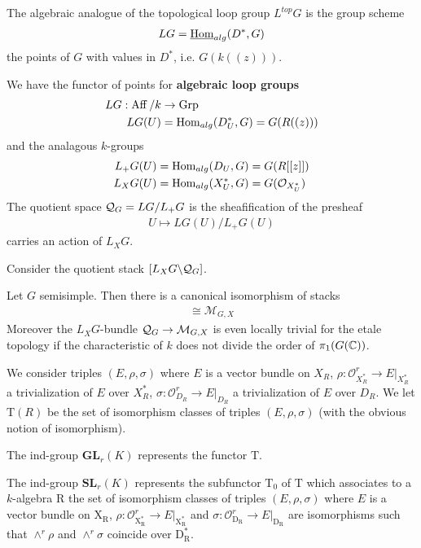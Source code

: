 \documentclass[12pt]{article}
\begin{document}
The algebraic analogue of the topological loop group $L^{top}G$ is the group scheme \begin{align*}
    LG = \underline{\operatorname{Hom}}_{alg}(D^*, G)
\end{align*} the points of $G$ with values in $D^*$, i.e. $G(k((z)))$.
\begin{definition}
    We have the functor of points for \textbf{algebraic loop groups} \begin{align*}
        LG: \operatorname{Aff}/k & \to \operatorname{Grp}                           \\
        LG(U)      & = \operatorname{Hom}_{alg}(D_U^*, G) = G(R((z)))
    \end{align*} and the analagous $k$-groups \begin{align*}
        L_+G(U) & = \operatorname{Hom}_{alg}(D_U, G) = G(R[[z]])        \\
        L_XG(U) & = \operatorname{Hom}_{alg}(X^*_U, G) = G({\mathcal{O}}_{X^*_U})
    \end{align*} The quotient space ${\mathcal{Q}}_G = LG/L_+G$ is the sheafification of the presheaf \begin{align*}
        U \mapsto LG(U)/L_+G(U)
    \end{align*} carries an action of $L_XG$.
\end{definition}
Consider the quotient stack $[L_XG\backslash {\mathcal{Q}}_G]$.
\begin{theorem}[Uniformization]
    Let $G$ semisimple. Then there is a canonical isomorphism of stacks \begin{align*}
        [L_XG\backslash \cQ_G] \cong \mathcal{M}_{G,X}
    \end{align*} Moreover the $L_XG$-bundle ${\mathcal{Q}}_G \to {\mathcal{M}}_{G,X}$ is even locally trivial for the etale topology if the characteristic of $k$ does not divide the order of $\pi_1(G(\mathbb{C}))$.
\end{theorem}
We consider triples $(E, \rho, \sigma)$ where $E$ is a vector bundle on $X_R$, $\rho : \mathcal{O}^r_{X^*_R} \longrightarrow E|_{X^*_R}$ a trivialization of $E$ over $X^*_R$, $\sigma : \mathcal{O}^r_{D_R} \longrightarrow E|_{D_R}$ a trivialization of $E$ over $D_R$. We let $\textrm{T}(R)$ be the set of isomorphism classes of triples $(E, \rho, \sigma)$ (with the obvious notion of isomorphism).
\begin{proposition}
    The ind-group $\mathbf{GL}_r(K)$ represents the functor $\textrm{T}$.
\end{proposition}
\begin{proposition}
    The ind-group $\mathbf{SL}_r(K)$ represents the subfunctor $\textrm{T}_0$ of $\textrm{T}$ which associates to a $k$-algebra $\textrm{R}$ the set of isomorphism classes of triples $(E, \rho, \sigma)$ where $E$ is a vector bundle on $\textrm{X}_{\textrm{R}}$, $\rho : \mathcal{O}^r_{\textrm{X}^*_{\textrm{R}}} \longrightarrow E|_{\textrm{X}^*_{\textrm{R}}}$ and $\sigma : \mathcal{O}^r_{\textrm{D}_{\textrm{R}}} \longrightarrow E|_{\textrm{D}_{\textrm{R}}}$ are isomorphisms such that $\wedge^r \rho$ and $\wedge^r \sigma$ coincide over $\textrm{D}^*_{\textrm{R}}$.
\end{proposition}
\end{document}
